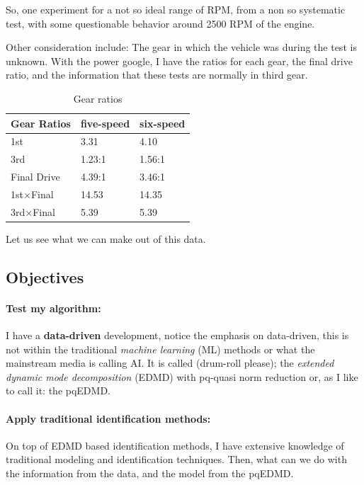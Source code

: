 \documentclass{article}
\begin{document}
So, one experiment for a not so ideal range of RPM, from a non so systematic test, with some questionable behavior around 2500 RPM of the engine. 

Other consideration include: The gear in which the vehicle was during the test is unknown. With the power google, I have the ratios for each gear, the final drive ratio, and the information that these tests are normally in third gear.

\begin{table}
	\caption{Gear ratios}\label{tab:gear_ratios}
	\begin{center}
		\begin{tabular}[c]{l|l|l}
			\hline
			Gear Ratios & five-speed & six-speed \\
			\hline
			1st & 3.31 & 4.10 \\
			3rd & 1.23:1 & 1.56:1 \\
			Final Drive & 4.39:1 & 3.46:1 \\
			\hline
			1st$\times$Final & 14.53 & 14.35 \\
			3rd$\times$Final & 5.39 & 5.39 \\
			\hline
		\end{tabular}
	\end{center}
\end{table}

Let us see what we can make out of this data.
\subsection{Objectives}\label{sub:Objectives} %
\paragraph{Test my algorithm:}\label{par:Test my algorithm} %
I have a \textbf{data-driven} development, notice the emphasis on data-driven, this is not within the traditional \textit{machine learning} (ML) methods or what the mainstream media is calling AI. It is called (drum-roll please); the \textit{extended dynamic mode decomposition} (EDMD) with pq-quasi norm reduction or, as I like to call it: the pqEDMD.  
\paragraph{Apply traditional identification methods:}\label{par:Apply traditional identification methods} %
On top of EDMD based identification methods, I have extensive knowledge of traditional modeling and identification techniques. Then, what can we do with the information from the data, and the model from the pqEDMD.
\end{document}
